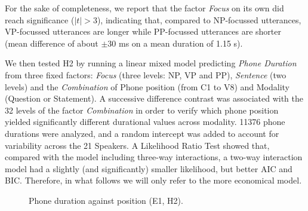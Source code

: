 For the sake of completeness, we report that the factor \textit{Focus} on its own did reach significance ($|t|>3$), indicating that, compared to NP-focussed utterances, VP-focussed utterances are longer while PP-focussed utterances are shorter (mean difference of about $\pm$30 ms on a mean duration of 1.15 s).

We then tested H2 by running a linear mixed model predicting \textit{Phone Duration} from three fixed factors: \textit{Focus} (three levels: NP, VP and PP), \textit{Sentence} (two levels) and the \textit{Combination} of Phone position (from C1 to V8) and Modality (Question or Statement).  A successive difference contrast was associated with the 32 levels of the factor \textit{Combination} in order to verify which phone position yielded significantly different durational values across modality. 11376 phone durations were analyzed, and a random intercept was added to account for variability across the 21 Speakers. A Likelihood Ratio Test showed that, compared with the model including three-way interactions, a two-way interaction model had a slightly (and significantly) smaller likelihood, but better AIC and BIC. Therefore, in what follows we will only refer to the more economical model. 

\begin{figure}
\centering
{}
\caption{Phone duration against position (E1, H2).}
\label{fig402}\end{figure}

